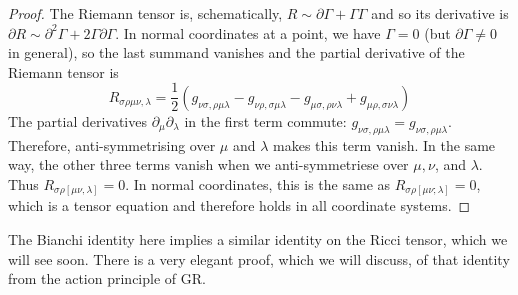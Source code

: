 \begin{proof}
  The Riemann tensor is, schematically, $R \sim \partial \Gamma + \Gamma\Gamma$ and so its derivative is $\partial R \sim \partial^2 \Gamma + 2 \Gamma \partial\Gamma$. In normal coordinates at a point, we have $\Gamma = 0$ (but $\partial\Gamma \neq 0$ in general), so the last summand vanishes and the partial derivative of the Riemann tensor is
  \begin{equation}
    R_{\sigma\rho\mu\nu,\lambda} = \frac{1}{2} ( g_{\nu\sigma,\rho\mu\lambda} - g_{\nu\rho,\sigma\mu\lambda} - g_{\mu\sigma,\rho\nu\lambda} + g_{\mu\rho,\sigma\nu\lambda})
  \end{equation}
  The partial derivatives $\partial_{\mu} \partial_{\lambda}$ in the first term commute: $g_{\nu\sigma,\rho\mu\lambda} = g_{\nu\sigma,\rho\mu\lambda}$. Therefore, anti-symmetrising over $\mu$ and $\lambda$ makes this term vanish. In the same way, the other three terms vanish when we anti-symmetriese over $\mu, \nu$, and $\lambda$. Thus $R_{\sigma\rho[\mu\nu,\lambda]} = 0$. In normal coordinates, this is the same as $R_{\sigma\rho[\mu\nu;\lambda]} = 0$, which is a tensor equation and therefore holds in all coordinate systems.
\end{proof}
\begin{leftbar}
  \begin{remark}
    The Bianchi identity here implies a similar identity on the Ricci tensor, which we will see soon. There is a very elegant proof, which we will discuss, of that identity from the action principle of GR.
  \end{remark}
\end{leftbar}
